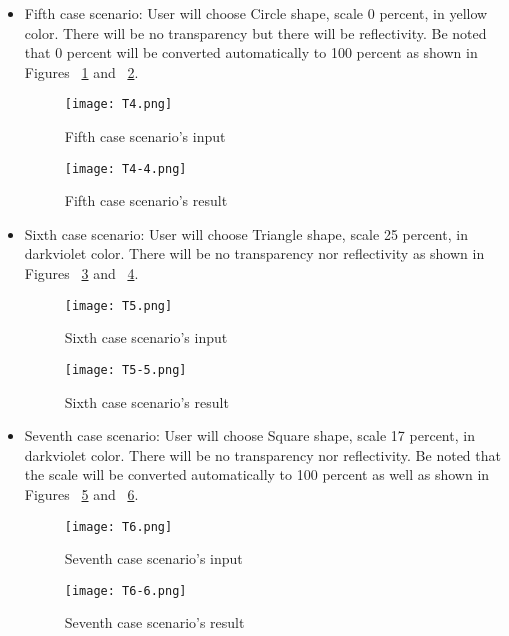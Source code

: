 \documentclass{article}
\begin{document}
\begin{itemize}
\item Fifth case scenario: \newline
User will choose Circle shape, scale 0 percent, in yellow color. There will be no transparency but there will be reflectivity. 
Be noted that 0 percent will be converted automatically to 100 percent as shown in Figures ~\ref{test5} and ~\ref{test5-5}.



\begin{figure}[H]
\centering
\texttt{[image: T4.png]}
\caption{Fifth case scenario's input \label{test5}}
\end{figure}

\begin{figure}
    \centering
    \texttt{[image: T4-4.png]}
    \caption{Fifth case scenario's result}
    \label{test5-5}
\end{figure}

\item Sixth case scenario: \newline
User will choose Triangle shape, scale 25 percent, in darkviolet color. There will be no transparency nor reflectivity as shown in Figures ~\ref{test6} and ~\ref{test6-6}. 

\begin{figure}[H]
\centering
\texttt{[image: T5.png]}
\caption{Sixth case scenario's input \label{test6}}
\end{figure}

\begin{figure}
    \centering
    \texttt{[image: T5-5.png]}
    \caption{Sixth case scenario's result}
    \label{test6-6}
\end{figure}

\item Seventh case scenario: \newline
User will choose Square shape, scale 17 percent, in darkviolet color. There will be no transparency nor reflectivity. Be noted that the scale will be converted automatically to 100 percent as well as shown in Figures ~\ref{test7} and ~\ref{test7-7}.

\begin{figure}[H]
\centering
\texttt{[image: T6.png]}
\caption{Seventh case scenario's input \label{test7}}
\end{figure}

\begin{figure}
    \centering
    \texttt{[image: T6-6.png]}
    \caption{Seventh case scenario's result}
    \label{test7-7}
\end{figure}

\end{itemize}
\end{document}
